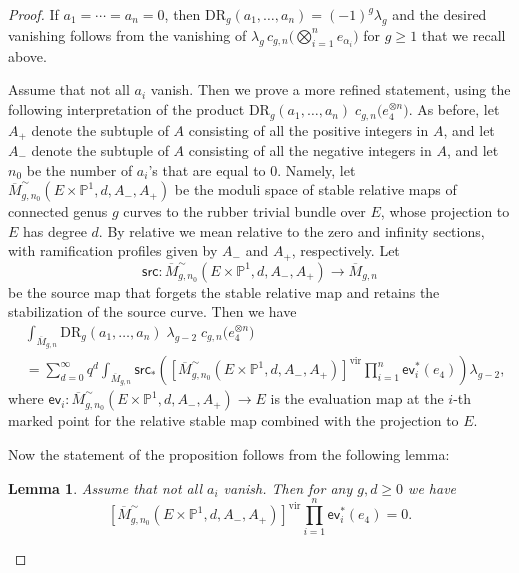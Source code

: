 \documentclass{amsart}
\numberwithin{equation}{section} %
\theoremstyle{plain}
\newtheorem{lemma}[theorem]{Lemma}
\theoremstyle{remark}
\begin{document}
\begin{proof} If $a_1=\cdots=a_n=0$, then  $\mathrm{DR}_g(a_1,\ldots,a_n) = (-1)^g\lambda_g$ and the desired vanishing follows from the vanishing of $\lambda_g \, c_{g,n}\big(\bigotimes_{i=1}^n e_{\alpha_i}\big)$ for $g\geq 1$ that we recall above.
	
Assume that not all $a_i$ vanish. Then we prove a more refined statement, using the following interpretation of the product $\mathrm{DR}_g(a_1,\ldots,a_n) \;c_{g,n}\!\big(e_4^{\otimes n}\big)$. As before, let $A_+$ denote the subtuple of $A$ consisting of all the positive integers in $A$, and let $A_-$ denote the subtuple of $A$ consisting of all the negative integers in $A$, and let $n_0$ be the number of $a_i$'s that are equal to $0$. Namely, let $\overline{M}^\sim_{g,n_0}(E\times \mathbb{P}^1, d, A_-, A_+)$ be the moduli space of stable relative maps of connected genus $g$ curves to the rubber trivial bundle over $E$, whose projection to $E$ has degree $d$. By relative we mean relative to the zero and infinity sections, with ramification profiles given by $A_-$ and $A_+$, respectively. Let
\begin{equation*}
	\mathsf{src} \colon \overline{M}^\sim_{g,n_0}(E
	\times \mathbb{P}^1, d, A_-, A_+) \rightarrow \overline{M}_{g,n}
\end{equation*}
be the source map that forgets the stable relative map and retains the stabilization of the source curve. Then we have
\begin{align*}
& \int_{\overline{M}_{g,n}} \mathrm{DR}_g(a_1,\ldots,a_n) \; \lambda_{g-2}\;c_{g,n}\!\big(e_4^{\otimes n}\big) 
\\ & =
\sum_{d=0}^\infty q^d \int_{\overline{M}_{g,n}} \mathsf{src}_* \left(
\left[\overline{M}^\sim_{g,n_0}(E
\times \mathbb{P}^1, d, A_-, A_+)\right]^{\mathrm{vir}} \prod_{i=1}^n \mathsf{ev}_i^*(e_4)\right) \lambda_{g-2}
,
\end{align*}
where $\mathsf{ev}_i\colon \overline{M}^\sim_{g,n_0}(E
\times \mathbb{P}^1, d, A_-, A_+) \to E$ is the evaluation map at the $i$-th marked point for the relative stable map combined with the projection to $E$. 
	
Now the statement of the proposition follows from the following lemma:
\begin{lemma} Assume that not all $a_i$ vanish. Then for any $g,d\geq 0$ we have 
\[
\left[\overline{M}^\sim_{g,n_0}(E
\times \mathbb{P}^1, d, A_-, A_+)\right]^{\mathrm{vir}} \prod_{i=1}^n \mathsf{ev}_i^*(e_4) = 0.
\]
\end{lemma}


\end{proof}
\end{document}
